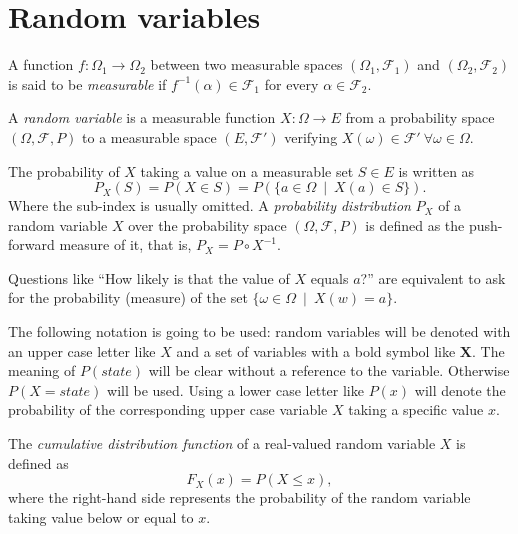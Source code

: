 \section*{Random variables}

\begin{definition}
A function \(f:\Omega_1 \to \Omega_2\) between two
measurable spaces \((\Omega_1, \mathcal{F}_1)\) and \((\Omega_2, \mathcal{F}_2)\) is said to be \emph{measurable} if \(f^{-1}(\alpha) \in \mathcal{F}_1\) for every \(\alpha \in \mathcal{F}_2\).
\end{definition}

\begin{definition}
  A \emph{random variable} is a measurable function \(X:\Omega \to E\) from a probability
  space \((\Omega, \mathcal{F}, P)\) to a measurable space \((E,
  \mathcal{F}')\) verifying \(X(\omega)\in \mathcal{F}' \ \forall \omega \in \Omega\).

  The probability of \(X\) taking a value on a measurable set \(S \in E\) is
  written as
  \[
    P_X(S) = P(X \in S) = P(\{a \in \Omega \ \mid  \ X(a) \in S \}).
  \]
  Where the sub-index is usually omitted. A \emph{probability distribution} \(P_{X}\) of a random
  variable \(X\) over the probability space \((\Omega, \mathcal{F}, P)\) is defined
  as the push-forward measure of it, that is, \(P_X = P \circ X^{-1}\).
\end{definition}

Questions like ``How likely is that the value of \(X\) equals
\(a\)?'' are equivalent to ask for the probability (measure) of the set \(\{\omega
\in \Omega \ \mid  \ X(w) = a\}\).

The following notation is going to be used: random variables will be
denoted with an upper case letter like \(X\) and a set of variables with a
bold symbol like \(\bm{X}\). The meaning of \(P(state)\) will be clear without a reference to the variable.
Otherwise \(P(X = state)\) will be used.
Using a lower case letter like \(P(x)\) will denote the probability of the
corresponding upper case variable \(X\) taking a specific value \(x\).

\begin{definition}
The \emph{cumulative distribution function} of a real-valued random variable \(X\) is defined as
\[
F_X (x) = P(X \leq x),
\]
where the right-hand side represents the probability of the random variable
taking value below or equal to \(x\).
\end{definition}

